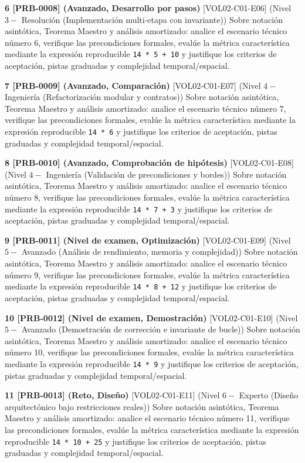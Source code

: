 \documentclass{book}
\begin{document}
\begin{tcolorbox}[title={Ejercicios}, studiumworked, breakable]
\noindent\textbf{6 [PRB-0008] (Avanzado, Desarrollo por pasos)}
[VOL02-C01-E06] (Nivel \(3 -\) Resolución (Implementación multi-etapa con invariante)) Sobre notación asintótica, Teorema Maestro y análisis amortizado: analice el escenario técnico número 6, verifique las precondiciones formales, evalúe la métrica característica mediante la expresión reproducible \texttt{14 * 5 + 10} y justifique los criterios de aceptación, pistas graduadas y complejidad temporal/espacial.

\noindent\textbf{7 [PRB-0009] (Avanzado, Comparación)}
[VOL02-C01-E07] (Nivel \(4 -\) Ingeniería (Refactorización modular y contratos)) Sobre notación asintótica, Teorema Maestro y análisis amortizado: analice el escenario técnico número 7, verifique las precondiciones formales, evalúe la métrica característica mediante la expresión reproducible \texttt{14 * 6} y justifique los criterios de aceptación, pistas graduadas y complejidad temporal/espacial.

\noindent\textbf{8 [PRB-0010] (Avanzado, Comprobación de hipótesis)}
[VOL02-C01-E08] (Nivel \(4 -\) Ingeniería (Validación de precondiciones y bordes)) Sobre notación asintótica, Teorema Maestro y análisis amortizado: analice el escenario técnico número 8, verifique las precondiciones formales, evalúe la métrica característica mediante la expresión reproducible \texttt{14 * 7 + 3} y justifique los criterios de aceptación, pistas graduadas y complejidad temporal/espacial.

\noindent\textbf{9 [PRB-0011] (Nivel de examen, Optimización)}
[VOL02-C01-E09] (Nivel \(5 -\) Avanzado (Análisis de rendimiento, memoria y complejidad)) Sobre notación asintótica, Teorema Maestro y análisis amortizado: analice el escenario técnico número 9, verifique las precondiciones formales, evalúe la métrica característica mediante la expresión reproducible \texttt{14 * 8 + 12} y justifique los criterios de aceptación, pistas graduadas y complejidad temporal/espacial.

\noindent\textbf{10 [PRB-0012] (Nivel de examen, Demostración)}
[VOL02-C01-E10] (Nivel \(5 -\) Avanzado (Demostración de corrección e invariante de bucle)) Sobre notación asintótica, Teorema Maestro y análisis amortizado: analice el escenario técnico número 10, verifique las precondiciones formales, evalúe la métrica característica mediante la expresión reproducible \texttt{14 * 9} y justifique los criterios de aceptación, pistas graduadas y complejidad temporal/espacial.

\noindent\textbf{11 [PRB-0013] (Reto, Diseño)}
[VOL02-C01-E11] (Nivel \(6 -\) Experto (Diseño arquitectónico bajo restricciones reales)) Sobre notación asintótica, Teorema Maestro y análisis amortizado: analice el escenario técnico número 11, verifique las precondiciones formales, evalúe la métrica característica mediante la expresión reproducible \texttt{14 * 10 + 25} y justifique los criterios de aceptación, pistas graduadas y complejidad temporal/espacial.


\end{tcolorbox}
\end{document}
